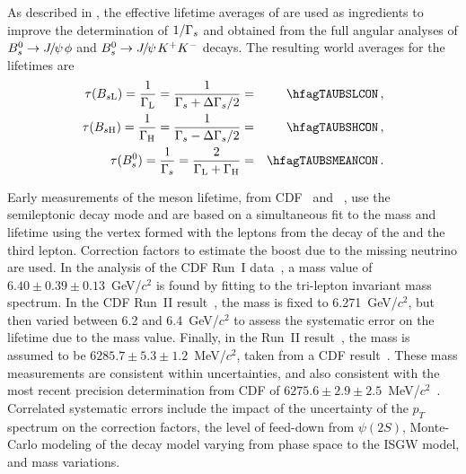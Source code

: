 As described in , 
the effective lifetime averages of 
are used as ingredients to improve the 
determination of $1/\Gamma_{s}$ and \DGs obtained from the full angular analyses
of $B^0_s\to {J\mskip -3mu/\mskip -2mu\psi\mskip 2mu}\phi$ and $B^0_s\to {J\mskip -3mu/\mskip -2mu\psi\mskip 2mu} K^+K^-$ decays. 
The resulting world averages for the \Bs lifetimes are
\begin{eqnarray}
\tau(\B_{s\rm L}) =
\frac{1}{\Gamma_{\rm L}} = \frac{1}{\Gs+\DGs/2} & = & \hfagTAUBSLCON \,, \\
\tau(\B_{s\rm H}) =
\frac{1}{\Gamma_{\rm H}} = \frac{1}{\Gs-\DGs/2} & = & \hfagTAUBSHCON \,, \\
\tau(\Bs) = \frac{1}{\Gs} = \frac{2}{\Gamma_{\rm L}+\Gamma_{\rm H}} & = & \hfagTAUBSMEANCON \,.
\labe{oneoverGs}
\end{eqnarray}


Early measurements of the \Bc meson lifetime,
from CDF~\cite{Abe:1998wi,CDFnote9294:2008,Abulencia:2006zu} and \dzero~\cite{Abazov:2008rba},
use the semileptonic decay mode \particle{\Bc \to \jpsi \ell} and are based on a 
simultaneous fit to the mass and lifetime using the vertex formed
with the leptons from the decay of the \particle{\jpsi} and
the third lepton. Correction factors
to estimate the boost due to the missing neutrino are used.
In the analysis of the CDF Run~I data~\cite{Abe:1998wi},
a mass value of 
$6.40 \pm 0.39 \pm 0.13$~GeV/$c^2$ 
is found by fitting
to the tri-lepton invariant mass spectrum. 
In the CDF Run~II result~\cite{Abulencia:2006zu}, the mass is fixed
to 6.271~GeV/$c^2$, but then varied between 
6.2 and 6.4~GeV/$c^2$ to assess the systematic error on the
lifetime due to the \Bc mass value.
Finally, in the \dzero Run~II result~\cite{Abazov:2008rba}, 
the \Bc mass is assumed to be 
$6285.7 \pm 5.3 \pm 1.2$~MeV/$c^2$, taken from a 
CDF result~\cite{Abulencia:2005usa}. 
These mass measurements
are consistent within uncertainties, and also consistent with the
most recent precision determination from CDF of 
$6275.6 \pm 2.9 \pm 2.5$~MeV/$c^2$~\cite{Aaltonen:2007gv}.
Correlated systematic errors include the impact
of the uncertainty of the \Bc $p_T$ spectrum on the correction
factors, the level of feed-down from $\psi(2S)$, 
Monte-Carlo modeling of the decay model varying from phase space
to the ISGW model, and mass variations.

